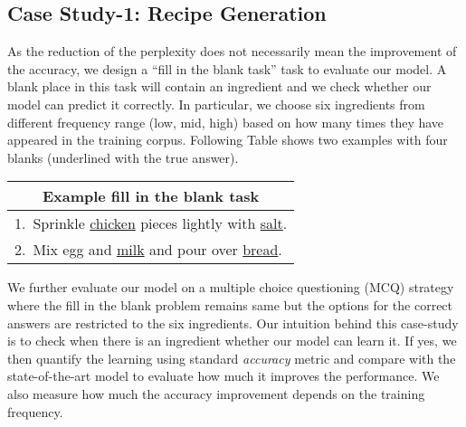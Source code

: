 \documentclass[11pt,a4paper]{article}
\begin{document}
\subsection{Case Study-1: Recipe Generation}

As the reduction of the perplexity does not necessarily mean the improvement of the accuracy, we design a ``fill in the blank task'' task to evaluate our model. 
A blank place in this task will contain an ingredient and we check whether our model can predict it correctly. In particular, we choose six ingredients from different frequency range (low, mid, high) based on how many times they have appeared in the training corpus. Following Table shows two examples with four blanks (underlined with the true answer).

\begin{center} 
\begin{tabular}{ l } 
\toprule
 \multicolumn{1}{c}{\textbf{\small Example fill in the blank task} } \\
 \midrule
 1.~Sprinkle \underline{chicken} pieces  lightly with \underline{salt}. \\  
 2.~Mix egg and \underline{milk} and pour over \underline{bread}.  \\
\bottomrule
\end{tabular}
\end{center}
\vspace{2pt}

We further evaluate our model on a multiple choice questioning (MCQ) strategy where the fill in the blank problem remains same but the options for the correct answers are restricted to the six ingredients. 
Our intuition behind this case-study is to check when there is an ingredient whether our model can learn it. If yes, we then quantify the learning using standard {\em accuracy} metric and compare with the state-of-the-art model to evaluate how much it improves the performance. We also measure how much the accuracy improvement depends on the training frequency.
\end{document}
